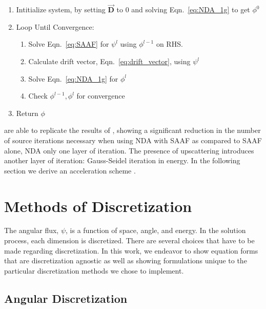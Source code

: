 \begin{enumerate}
    \item Intitialize system, by setting $\vec{\textbf{D}}$ to 0 and solving Eqn.~\eqref{eq:NDA_1g} to get $\phi^0$ 
    \item Loop Until Convergence:
        \begin{enumerate}
            \item Solve Eqn.~\eqref{eq:SAAF} for $\psi^l$ using $\phi^{l-1}$ on RHS.
            \item Calculate drift vector, Eqn.~\eqref{eq:drift_vector}, using $\psi^l$
            \item Solve Eqn.~\eqref{eq:NDA_1g} for $\phi^l$
            \item Check $\phi^{l-1}, \phi^l$ for convergence
        \end{enumerate}
    \item Return $\phi$
\end{enumerate}

\DIFdelbegin {}\DIFdelend \DIFaddbegin {}\DIFaddend are able to replicate the results of \cite{Wang2013}, showing a significant reduction in the number of source iterations necessary when using NDA with SAAF as compared to SAAF alone\DIFdelbegin {}\DIFdelend , NDA only \DIFdelbegin {}\DIFdelend \DIFaddbegin {}\DIFaddend one layer of iteration. The presence of upscattering introduces another layer of iteration: Gauss-Seidel iteration in energy. \DIFdelbegin {}\DIFdelend In the following section we derive an acceleration scheme \DIFdelbegin {}\DIFdelend \DIFaddbegin {}\DIFaddend .


\section{Methods of Discretization}
The angular flux, $\psi$, is a function of space, angle, and energy. In the solution process, each dimension is discretized. There are several choices that have to be made regarding discretization. In this work, we endeavor to show equation forms that are discretization agnostic as well as showing formulations unique to the particular discretization methods we chose to implement. 

\subsection{Angular Discretization}


